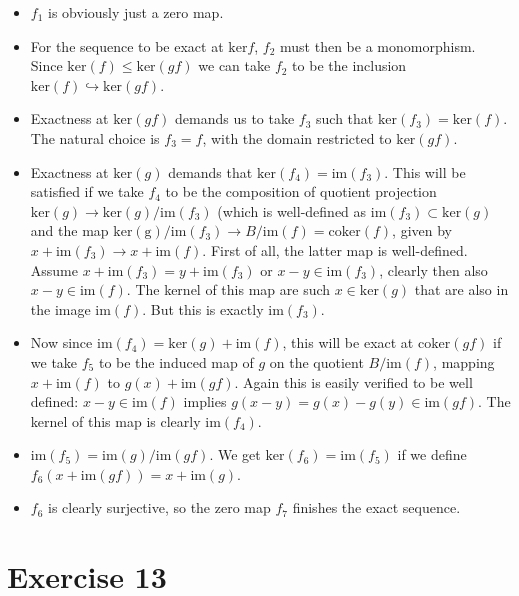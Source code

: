 \documentclass{article}
\begin{document}
\begin{itemize}
\item $f_1$ is obviously just a zero map. 
\item For the sequence to be exact at $\mathrm{ker} f$, $f_2$ must then be a monomorphism. 
Since $\mathrm{ker}(f) \leq \mathrm{ker}(gf)$ we can take $f_2$ to be the inclusion $\mathrm{ker}(f) \hookrightarrow \mathrm{ker}(gf)$. 
\item Exactness at $\mathrm{ker}(gf)$ demands us to take $f_3$ such that $\mathrm{ker}(f_3) = \mathrm{ker}(f)$. The natural choice is $f_3=f$, with the domain restricted to $\mathrm{ker}(gf)$.
\item Exactness at $\mathrm{ker}(g)$ demands that $\mathrm{ker}(f_4) = \mathrm{im}(f_3)$. This will be satisfied if we take $f_4$ to be the composition of quotient projection $\mathrm{ker}(g) \to \mathrm{ker}(g)/\mathrm{im}(f_3)$ (which is well-defined as $\mathrm{im}(f_3) \subset \mathrm{ker}(g)$ and the map $\mathrm{ker(g)}/\mathrm{im}(f_3) \to B/\mathrm{im}(f) = \mathrm{coker}(f)$, given by $x + \mathrm{im}(f_3) \to x + \mathrm{im}(f)$.
First of all, the latter map is well-defined. Assume $x+\mathrm{im}(f_3) = y+\mathrm{im}(f_3)$ or $x-y \in \mathrm{im}(f_3)$, clearly then also $x-y \in \mathrm{im}(f)$. The kernel of this map are such $x \in \mathrm{ker}(g)$ that are also in the image $\mathrm{im}(f)$. But this is exactly $\mathrm{im}(f_3)$.
\item Now since $\mathrm{im}(f_4) = \mathrm{ker}(g) + \mathrm{im}(f)$, this will be exact at $\mathrm{coker}(gf)$ if we take $f_5$ to be the induced map of $g$ on the quotient $B/\mathrm{im}(f)$, mapping $x+\mathrm{im}(f)$ to $g(x)+\mathrm{im}(gf)$. Again this is easily verified to be well defined: $x-y \in \mathrm{im}(f)$ implies $g(x-y) = g(x)-g(y) \in \mathrm{im}(gf)$. The kernel of this map is clearly $\mathrm{im}(f_4)$.
\item $\mathrm{im}(f_5) = \mathrm{im}(g) / \mathrm{im}(gf)$. We get $\mathrm{ker}(f_6) = \mathrm{im}(f_5)$ if we define $f_6(x + \mathrm{im}(gf)) = x + \mathrm{im}(g)$.
\item $f_6$ is clearly surjective, so the zero map $f_7$ finishes the exact sequence.
\end{itemize}

\newpage
\section*{Exercise 13}
\end{document}
